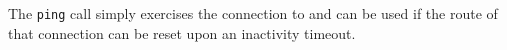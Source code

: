 The \verb+ping+ call simply exercises the connection to \Rapture and can be used if the route of that connection
can be reset upon an inactivity timeout.
